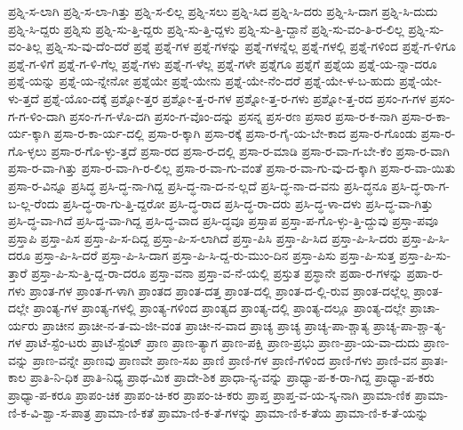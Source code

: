 {ಪ್ರಶ್ನಿ-ಸ-ಲಾಗಿ
ಪ್ರಶ್ನಿ-ಸ-ಲಾ-ಗಿತ್ತು
ಪ್ರಶ್ನಿ-ಸ-ಲಿಲ್ಲ
ಪ್ರಶ್ನಿ-ಸಲು
ಪ್ರಶ್ನಿ-ಸಿದ
ಪ್ರಶ್ನಿ-ಸಿ-ದರು
ಪ್ರಶ್ನಿ-ಸಿ-ದಾಗ
ಪ್ರಶ್ನಿ-ಸಿ-ದುದು
ಪ್ರಶ್ನಿ-ಸಿ-ದ್ದರು
ಪ್ರಶ್ನಿಸು
ಪ್ರಶ್ನಿ-ಸು-ತ್ತಿ-ದ್ದರು
ಪ್ರಶ್ನಿ-ಸು-ತ್ತಿ-ದ್ದಳು
ಪ್ರಶ್ನಿ-ಸು-ತ್ತಿ-ದ್ದಾನೆ
ಪ್ರಶ್ನಿ-ಸು-ವಂ-ತಿ-ರ-ಲಿಲ್ಲ
ಪ್ರಶ್ನಿ-ಸು-ವಂ-ತಿಲ್ಲ
ಪ್ರಶ್ನಿ-ಸು-ವು-ದೆಂ-ದರೆ
ಪ್ರಶ್ನೆ
ಪ್ರಶ್ನೆ-ಗಳ
ಪ್ರಶ್ನೆ-ಗಳನ್ನು
ಪ್ರಶ್ನೆ-ಗಳನ್ನೆಲ್ಲ
ಪ್ರಶ್ನೆ-ಗಳಲ್ಲಿ
ಪ್ರಶ್ನೆ-ಗಳಿಂದ
ಪ್ರಶ್ನೆ-ಗ-ಳಿಗೂ
ಪ್ರಶ್ನೆ-ಗ-ಳಿಗೆ
ಪ್ರಶ್ನೆ-ಗ-ಳಿ-ಗೆಲ್ಲ
ಪ್ರಶ್ನೆ-ಗಳು
ಪ್ರಶ್ನೆ-ಗ-ಳೆಲ್ಲ
ಪ್ರಶ್ನೆ-ಗಳೇ
ಪ್ರಶ್ನೆಗೂ
ಪ್ರಶ್ನೆಗೆ
ಪ್ರಶ್ನೆಯ
ಪ್ರಶ್ನೆ-ಯ-ನ್ನಾ-ದರೂ
ಪ್ರಶ್ನೆ-ಯನ್ನು
ಪ್ರಶ್ನೆ-ಯ-ನ್ನೇನೋ
ಪ್ರಶ್ನೆಯೇ
ಪ್ರಶ್ನೆ-ಯೇನು
ಪ್ರಶ್ನೆ-ಯೇ-ನೆಂ-ದರೆ
ಪ್ರಶ್ನೆ-ಯೇ-ಳ-ಬ-ಹುದು
ಪ್ರಶ್ನೆ-ಯೇ-ಳು-ತ್ತದೆ
ಪ್ರಶ್ನೆ-ಯೊಂ-ದಕ್ಕೆ
ಪ್ರಶ್ನೋ-ತ್ತರ
ಪ್ರಶ್ನೋ-ತ್ತ-ರ-ಗಳ
ಪ್ರಶ್ನೋ-ತ್ತ-ರ-ಗಳು
ಪ್ರಶ್ನೋ-ತ್ತ-ರದ
ಪ್ರಸಂ-ಗ-ಗಳ
ಪ್ರಸಂ-ಗ-ಗ-ಳಿಂ-ದಾಗಿ
ಪ್ರಸಂ-ಗ-ಗ-ಳೊ-ದಗಿ
ಪ್ರಸಂ-ಗ-ವೊಂ-ದನ್ನು
ಪ್ರಸನ್ನ
ಪ್ರಸ-ರಣ
ಪ್ರಸಾರ
ಪ್ರಸಾ-ರ-ಕ-ನಾಗಿ
ಪ್ರಸಾ-ರ-ಕಾ-ರ್ಯ-ಕ್ಕಾಗಿ
ಪ್ರಸಾ-ರ-ಕಾ-ರ್ಯ-ದಲ್ಲಿ
ಪ್ರಸಾ-ರ-ಕ್ಕಾಗಿ
ಪ್ರಸಾ-ರಕ್ಕೆ
ಪ್ರಸಾ-ರ-ಗೈ-ಯ-ಬೇ-ಕಾದ
ಪ್ರಸಾ-ರ-ಗೊಂಡು
ಪ್ರಸಾ-ರ-ಗೊ-ಳ್ಳಲು
ಪ್ರಸಾ-ರ-ಗೊ-ಳ್ಳು-ತ್ತದೆ
ಪ್ರಸಾ-ರದ
ಪ್ರಸಾ-ರ-ದಲ್ಲಿ
ಪ್ರಸಾ-ರ-ಮಾಡಿ
ಪ್ರಸಾ-ರ-ವಾ-ಗ-ಬೇ-ಕೆಂ
ಪ್ರಸಾ-ರ-ವಾಗಿ
ಪ್ರಸಾ-ರ-ವಾ-ಗಿತ್ತು
ಪ್ರಸಾ-ರ-ವಾ-ಗಿ-ರ-ಲಿಲ್ಲ
ಪ್ರಸಾ-ರ-ವಾ-ಗು-ವಂತೆ
ಪ್ರಸಾ-ರ-ವಾ-ಗು-ವು-ದ-ಕ್ಕಾಗಿ
ಪ್ರಸಾ-ರ-ವಾ-ಯಿತು
ಪ್ರಸಾ-ರ-ವಿನ್ನೂ
ಪ್ರಸಿದ್ಧ
ಪ್ರಸಿ-ದ್ಧ-ನಾ-ಗಿದ್ದ
ಪ್ರಸಿ-ದ್ಧ-ನಾ-ದ-ನ-ಲ್ಲದೆ
ಪ್ರಸಿ-ದ್ಧ-ನಾ-ದ-ವನು
ಪ್ರಸಿ-ದ್ಧನೂ
ಪ್ರಸಿ-ದ್ಧ-ರಾ-ಗ-ಬ-ಲ್ಲ-ರೆಂದು
ಪ್ರಸಿ-ದ್ಧ-ರಾ-ಗು-ತ್ತಿ-ದ್ದರೋ
ಪ್ರಸಿ-ದ್ಧ-ರಾದ
ಪ್ರಸಿ-ದ್ಧ-ರಾ-ದರು
ಪ್ರಸಿ-ದ್ಧ-ಳಾ-ದಳು
ಪ್ರಸಿ-ದ್ಧ-ವಾ-ಗಿತ್ತು
ಪ್ರಸಿ-ದ್ಧ-ವಾ-ಗಿದೆ
ಪ್ರಸಿ-ದ್ಧ-ವಾ-ಗಿದ್ದ
ಪ್ರಸಿ-ದ್ಧ-ವಾದ
ಪ್ರಸಿ-ದ್ಧವೂ
ಪ್ರಸ್ತಾಪ
ಪ್ರಸ್ತಾ-ಪ-ಗೊ-ಳ್ಳು-ತ್ತಿ-ದ್ದುವು
ಪ್ರಸ್ತಾ-ಪವೂ
ಪ್ರಸ್ತಾಪಿ
ಪ್ರಸ್ತಾ-ಪಿಸ
ಪ್ರಸ್ತಾ-ಪಿ-ಸ-ದಿದ್ದ
ಪ್ರಸ್ತಾ-ಪಿ-ಸ-ಲಾಗಿದೆ
ಪ್ರಸ್ತಾ-ಪಿಸಿ
ಪ್ರಸ್ತಾ-ಪಿ-ಸಿದ
ಪ್ರಸ್ತಾ-ಪಿ-ಸಿ-ದರು
ಪ್ರಸ್ತಾ-ಪಿ-ಸಿ-ದರೂ
ಪ್ರಸ್ತಾ-ಪಿ-ಸಿ-ದರೆ
ಪ್ರಸ್ತಾ-ಪಿ-ಸಿ-ದಾಗ
ಪ್ರಸ್ತಾ-ಪಿ-ಸಿ-ದ್ದ-ರು-ಮುಂ-ದಿನ
ಪ್ರಸ್ತಾ-ಪಿಸು
ಪ್ರಸ್ತಾ-ಪಿ-ಸುತ್ತ
ಪ್ರಸ್ತಾ-ಪಿ-ಸು-ತ್ತಾರೆ
ಪ್ರಸ್ತಾ-ಪಿ-ಸು-ತ್ತಿ-ದ್ದ-ರಾ-ದರೂ
ಪ್ರಸ್ತಾ-ವನಾ
ಪ್ರಸ್ತಾ-ವ-ನೆ-ಯಲ್ಲಿ
ಪ್ರಸ್ತುತ
ಪ್ರಸ್ಥಾನೇ
ಪ್ರಹಾ-ರ-ಗಳನ್ನು
ಪ್ರಹಾ-ರ-ಗಳು
ಪ್ರಾಂತ-ಗಳ
ಪ್ರಾಂತ-ಗ-ಳಾಗಿ
ಪ್ರಾಂತದ
ಪ್ರಾಂತ-ದತ್ತ
ಪ್ರಾಂತ-ದಲ್ಲಿ
ಪ್ರಾಂತ-ದ-ಲ್ಲಿ-ರುವ
ಪ್ರಾಂತ-ದಲ್ಲೆಲ್ಲ
ಪ್ರಾಂತ-ದಲ್ಲೇ
ಪ್ರಾಂತ್ಯ-ಗಳ
ಪ್ರಾಂತ್ಯ-ಗಳಲ್ಲಿ
ಪ್ರಾಂತ್ಯ-ಗಳಿಂದ
ಪ್ರಾಂತ್ಯದ
ಪ್ರಾಂತ್ಯ-ದಲ್ಲಿ
ಪ್ರಾಂತ್ಯ-ದಲ್ಲೂ
ಪ್ರಾಂತ್ಯ-ದಲ್ಲೇ
ಪ್ರಾಚಾ-ರ್ಯರು
ಪ್ರಾಚೀನ
ಪ್ರಾಚೀ-ನ-ತ-ಮ-ಜೀ-ವಂತ
ಪ್ರಾಚೀ-ನ-ವಾದ
ಪ್ರಾಚ್ಯ
ಪ್ರಾಚ್ಯ
ಪ್ರಾಚ್ಯ-ಪಾ-ಶ್ಚಾತ್ಯ
ಪ್ರಾಚ್ಯ-ಪಾ-ಶ್ಚಾ-ತ್ಯ-ಗಳ
ಪ್ರಾಟೆ-ಸ್ಟೆಂ-ಟರು
ಪ್ರಾಟೆ-ಸ್ಟೆಂಟ್
ಪ್ರಾಣ
ಪ್ರಾಣ-ತ್ಯಾಗ
ಪ್ರಾಣ-ಪಕ್ಷಿ
ಪ್ರಾಣ-ಪ್ರಭು
ಪ್ರಾಣ-ಪ್ರಾ-ಯ-ವಾ-ದುದು
ಪ್ರಾಣ-ವನ್ನು
ಪ್ರಾಣ-ವನ್ನೇ
ಪ್ರಾಣವು
ಪ್ರಾಣವೇ
ಪ್ರಾಣ-ಸಖ
ಪ್ರಾಣಿ
ಪ್ರಾಣಿ-ಗಳ
ಪ್ರಾಣಿ-ಗಳಿಂದ
ಪ್ರಾಣಿ-ಗಳು
ಪ್ರಾಣಿ-ವನ
ಪ್ರಾತಃ-ಕಾಲ
ಪ್ರಾತಿ-ನಿ-ಧಿಕ
ಪ್ರಾತಿ-ನಿಧ್ಯ
ಪ್ರಾಥ-ಮಿಕ
ಪ್ರಾದೇ-ಶಿಕ
ಪ್ರಾಧಾ-ನ್ಯ-ವನ್ನು
ಪ್ರಾಧ್ಯಾ-ಪ-ಕ-ರಾ-ಗಿದ್ದ
ಪ್ರಾಧ್ಯಾ-ಪ-ಕರು
ಪ್ರಾಧ್ಯಾ-ಪ-ಕರೂ
ಪ್ರಾಪಂ-ಚಿಕ
ಪ್ರಾಪಂ-ಚಿ-ಕರ
ಪ್ರಾಪಂ-ಚಿ-ಕರು
ಪ್ರಾಪ್ತ
ಪ್ರಾಪ್ತ-ವ-ಯ-ಸ್ಕ-ನಾಗಿ
ಪ್ರಾಮಾ-ಣಿಕ
ಪ್ರಾಮಾ-ಣಿ-ಕ-ವಿ-ಶ್ವಾ-ಸ-ಪಾತ್ರ
ಪ್ರಾಮಾ-ಣಿ-ಕತೆ
ಪ್ರಾಮಾ-ಣಿ-ಕ-ತೆ-ಗಳನ್ನು
ಪ್ರಾಮಾ-ಣಿ-ಕ-ತೆಯ
ಪ್ರಾಮಾ-ಣಿ-ಕ-ತೆ-ಯನ್ನು
}
